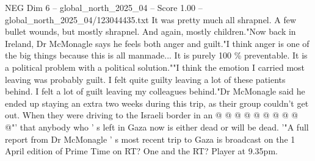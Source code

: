 \begin{textsample}{NEG Dim 6 – global\_north\_2025\_04 – Score 1.00 – global\_north\_2025\_04/123044435.txt}
It was pretty much all shrapnel.
A few bullet wounds, but mostly shrapnel.
And again, mostly children."Now back in Ireland, Dr McMonagle says he feels both anger and guilt."I think anger is one of the big things because this is all manmade...
It is purely 100 \% preventable.
It is a political problem with a political solution.""I think the emotion I carried most leaving was probably guilt.
I felt quite guilty leaving a lot of these patients behind.
I felt a lot of guilt leaving my colleagues behind."Dr McMonagle said he ended up staying an extra two weeks during this trip, as their group couldn't get out.
When they were driving to the Israeli border in an @ @ @ @ @ @ @ @ @ @"' that anybody who ' s left in Gaza now is either dead or will be dead. '"A full report from Dr McMonagle ' s most recent trip to Gaza is broadcast on the 1 April edition of Prime Time on RT?
One and the RT?
Player at 9.35pm.

\end{textsample}
